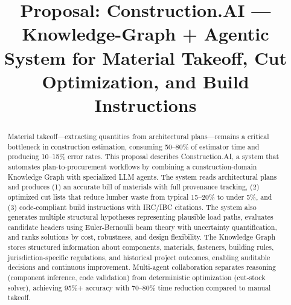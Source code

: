 \documentclass[conference]{IEEEtran}
\title{Proposal: Construction.AI --- Knowledge-Graph + Agentic System for Material Takeoff, Cut Optimization, and Build Instructions}
\author{
\IEEEauthorblockN{Jason Cusati}
\IEEEauthorblockA{Construction.AI Project}
}
\begin{document}
\maketitle

\begin{abstract}
Material takeoff---extracting quantities from architectural plans---remains a critical bottleneck in construction estimation, consuming 50--80\% of estimator time and producing 10--15\% error rates.
This proposal describes Construction.AI, a system that automates plan-to-procurement workflows by combining a construction-domain Knowledge Graph with specialized LLM agents.
The system reads architectural plans and produces (1) an accurate bill of materials with full provenance tracking,
(2) optimized cut lists that reduce lumber waste from typical 15--20\% to under 5\%,
and (3) code-compliant build instructions with IRC/IBC citations.
The system also generates multiple structural hypotheses representing plausible load paths, evaluates candidate headers using Euler-Bernoulli beam theory with uncertainty quantification, and ranks solutions by cost, robustness, and design flexibility.
The Knowledge Graph stores structured information about components, materials, fasteners, building rules, jurisdiction-specific regulations, and historical project outcomes, enabling auditable decisions and continuous improvement.
Multi-agent collaboration separates reasoning (component inference, code validation) from deterministic optimization (cut-stock solver), achieving 95\%+ accuracy with 70--80\% time reduction compared to manual takeoff.
\end{abstract}



















\end{document}
